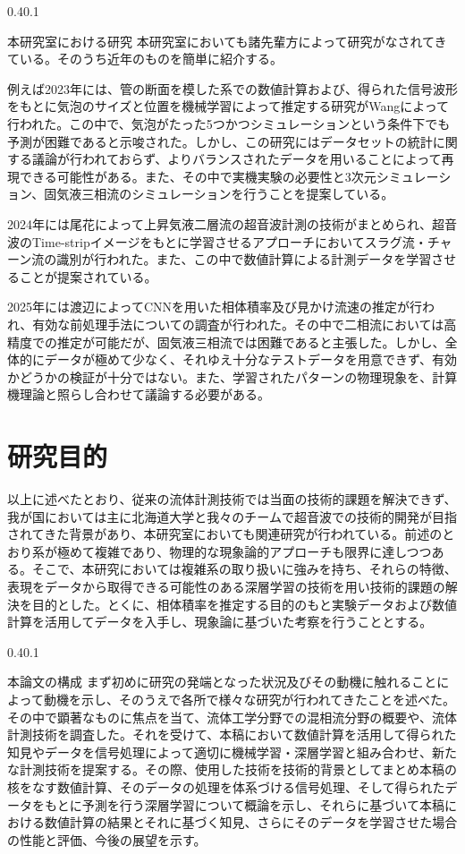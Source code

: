 \documentclass[uplatex]{suribt}
\makeatletter
\renewcommand{\subsection}{%
    \@startsection{subsection}{1}{\z@}%
    {0.4\Cvs}{0.1\Cvs}%
    {\normalfont\normalsize\headfont\raggedright}}
\makeatother
\begin{document}
\subsection{本研究室における研究}
本研究室においても諸先輩方によって研究がなされてきている。そのうち近年のものを簡単に紹介する。\par
例えば2023年には、管の断面を模した系での数値計算および、得られた信号波形をもとに気泡のサイズと位置を機械学習によって推定する研究がWangによって行われた。この中で、気泡がたった5つかつシミュレーションという条件下でも予測が困難であると示唆された。しかし、この研究にはデータセットの統計に関する議論が行われておらず、よりバランスされたデータを用いることによって再現できる可能性がある。また、その中で実機実験の必要性と3次元シミュレーション、固気液三相流のシミュレーションを行うことを提案している。\par
2024年には尾花によって上昇気液二層流の超音波計測の技術がまとめられ、超音波のTime-stripイメージをもとに学習させるアプローチにおいてスラグ流・チャーン流の識別が行われた。また、この中で数値計算による計測データを学習させることが提案されている。\par
2025年には渡辺によってCNNを用いた相体積率及び見かけ流速の推定が行われ、有効な前処理手法についての調査が行われた。その中で二相流においては高精度での推定が可能だが、固気液三相流では困難であると主張した。しかし、全体的にデータが極めて少なく、それゆえ十分なテストデータを用意できず、有効かどうかの検証が十分ではない。また、学習されたパターンの物理現象を、計算機理論と照らし合わせて議論する必要がある。\par

\section{研究目的}
以上に述べたとおり、従来の流体計測技術では当面の技術的課題を解決できず、我が国においては主に北海道大学と我々のチームで超音波での技術的開発が目指されてきた背景があり、本研究室においても関連研究が行われている。前述のとおり系が極めて複雑であり、物理的な現象論的アプローチも限界に達しつつある。そこで、本研究においては複雑系の取り扱いに強みを持ち、それらの特徴、表現をデータから取得できる可能性のある深層学習の技術を用い技術的課題の解決を目的とした。とくに、相体積率を推定する目的のもと実験データおよび数値計算を活用してデータを入手し、現象論に基づいた考察を行うこととする。

\subsection{本論文の構成}
まず初めに研究の発端となった状況及びその動機に触れることによって動機を示し、そのうえで各所で様々な研究が行われてきたことを述べた。その中で顕著なものに焦点を当て、流体工学分野での混相流分野の概要や、流体計測技術を調査した。それを受けて、本稿において数値計算を活用して得られた知見やデータを信号処理によって適切に機械学習・深層学習と組み合わせ、新たな計測技術を提案する。その際、使用した技術を技術的背景としてまとめ本稿の核をなす数値計算、そのデータの処理を体系づける信号処理、そして得られたデータをもとに予測を行う深層学習について概論を示し、それらに基づいて本稿における数値計算の結果とそれに基づく知見、さらにそのデータを学習させた場合の性能と評価、今後の展望を示す。
\end{document}
